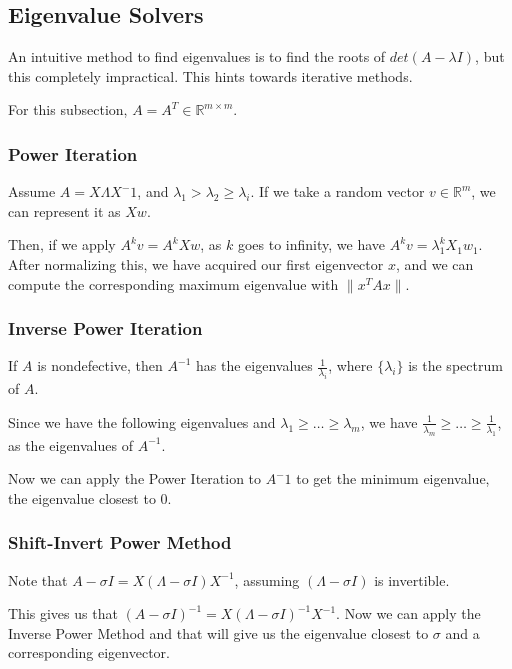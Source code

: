 \documentclass{article}
\theoremstyle{definition}
\begin{document}
\subsection{Eigenvalue Solvers}

An intuitive method to find eigenvalues is to find the roots of $det(A - \lambda I)$, but this completely impractical. This hints towards iterative methods.

For this subsection, $A = A^T \in \mathbb{R}^{m \times m}$.

\subsubsection{Power Iteration}

Assume $A = X \Lambda X^-1$, and $\lambda_1 > \lambda_2 \geq \lambda_i$. If we take a random vector $v \in \mathbb{R}^{m}$, we can represent it as $X w$.

Then, if we apply $A^k v = A^k X w$, as $k$ goes to infinity, we have $A^k v = \lambda_1^k X_1 w_1$. After normalizing this, we have acquired our first eigenvector $x$, and we can compute the corresponding maximum eigenvalue with $\|x^T A x\|$.

\subsubsection{Inverse Power Iteration}

If $A$ is nondefective, then $A^{-1}$ has the eigenvalues $\frac{1}{\lambda_i}$, where $\{\lambda_i\}$ is the spectrum of $A$.

Since we have the following eigenvalues and $\lambda_1 \geq \dots \geq \lambda_m$, we have $\frac{1}{\lambda_m} \geq \dots \geq \frac{1}{\lambda_1}$, as the eigenvalues of $A^{-1}$. 

Now we can apply the Power Iteration to $A^-1$ to get the minimum eigenvalue, the eigenvalue closest to $0$.

\subsubsection{Shift-Invert Power Method}

Note that $A - \sigma I = X (\Lambda - \sigma I) X^{-1}$, assuming $(\Lambda - \sigma I)$ is invertible. 

This gives us that $(A - \sigma I)^{-1} = X (\Lambda - \sigma I)^{-1} X^{-1}$. Now we can apply the Inverse Power Method and that will give us the eigenvalue closest to $\sigma$ and a corresponding eigenvector.
\end{document}
